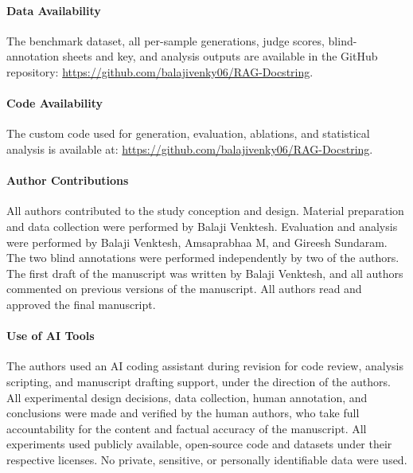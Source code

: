 \documentclass[pdflatex,sn-mathphys-ay]{sn-jnl}%
\theoremstyle{thmstyleone}%
\theoremstyle{thmstyletwo}%
\theoremstyle{thmstylethree}%
\begin{document}
\paragraph{Data Availability}
The benchmark dataset, all per-sample generations, judge scores, blind-annotation sheets and key, and analysis outputs are available in the GitHub repository: \url{https://github.com/balajivenky06/RAG-Docstring}.

\paragraph{Code Availability}
The custom code used for generation, evaluation, ablations, and statistical analysis is available at: \url{https://github.com/balajivenky06/RAG-Docstring}.

\paragraph{Author Contributions}
All authors contributed to the study conception and design. Material preparation and data collection were performed by Balaji Venktesh. Evaluation and analysis were performed by Balaji Venktesh, Amsaprabhaa M, and Gireesh Sundaram. The two blind annotations were performed independently by two of the authors. The first draft of the manuscript was written by Balaji Venktesh, and all authors commented on previous versions of the manuscript. All authors read and approved the final manuscript.

\paragraph{Use of AI Tools}
The authors used an AI coding assistant during revision for code review, analysis scripting, and manuscript drafting support, under the direction of the authors. All experimental design decisions, data collection, human annotation, and conclusions were made and verified by the human authors, who take full accountability for the content and factual accuracy of the manuscript. All experiments used publicly available, open-source code and datasets under their respective licenses. No private, sensitive, or personally identifiable data were used.



\appendix
\end{document}
